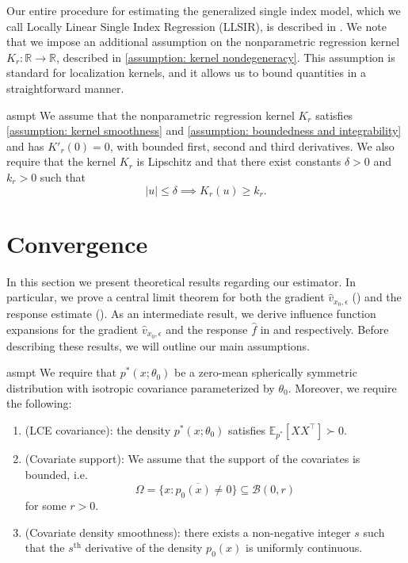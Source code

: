 \documentclass[11pt]{article}
\begin{document}
Our entire procedure for estimating the generalized single index model, which we call Locally Linear Single Index Regression (LLSIR), is described in . We note that we impose an additional assumption on the nonparametric regression kernel $K_r:\mathbb{R} \rightarrow \mathbb{R}$, described in \cref{assumption: kernel nondegeneracy}. This assumption is standard for localization kernels, and it allows us to bound quantities in a straightforward manner.

\begin{restatable}{asmpt}{} \label{assumption: kernel nondegeneracy}
    We assume that the nonparametric regression kernel $K_r$ satisfies \cref{assumption: kernel smoothness} and \cref{assumption: boundedness and integrability} and has $K'_r(0) = 0$, with bounded first, second and third derivatives. We also require that the kernel $K_r$ is Lipschitz and that there exist constants $\delta > 0$ and $k_r > 0$ such that 
    \[|u| \leq \delta \implies K_r(u) \geq k_r.\]
\end{restatable}

\section{Convergence} \label{sec: theoretical results}

In this section we present theoretical results regarding our estimator. In particular, we prove a central limit theorem for both the gradient $\hat{v}_{x_0, \epsilon}$ () and the response estimate (). As an intermediate result, we derive influence function expansions for the gradient $\hat{v}_{x_0, \epsilon}$ and the response $\hat f$ in  and  respectively. Before describing these results, we will outline our main assumptions.

\begin{restatable}{asmpt}{} \label{assumption: lce and covariate density}
    We require that $p^*(x;\theta_0)$ be a zero-mean spherically symmetric distribution with isotropic covariance parameterized by $\theta_0$. Moreover, we require the following: 
    \begin{enumerate}
        \item (LCE covariance): the density $p^*(x;\theta_0)$ satisfies $\mathbb{E}_{p^*}[XX^{\top}] \succ 0$. 
        \item (Covariate support): We assume that the support of the covariates is bounded, i.e. \[\Omega = \overline{\{x : p_0(x) \neq 0\}} \subseteq \mathcal{B}(0, r)\]
        for some $r > 0$.
        \item (Covariate density smoothness): 
        there exists a non-negative integer $s$ such that the $s^{\text{th}}$ derivative of the density $p_0(x)$ is uniformly continuous.
    \end{enumerate} 
\end{restatable}
\end{document}
